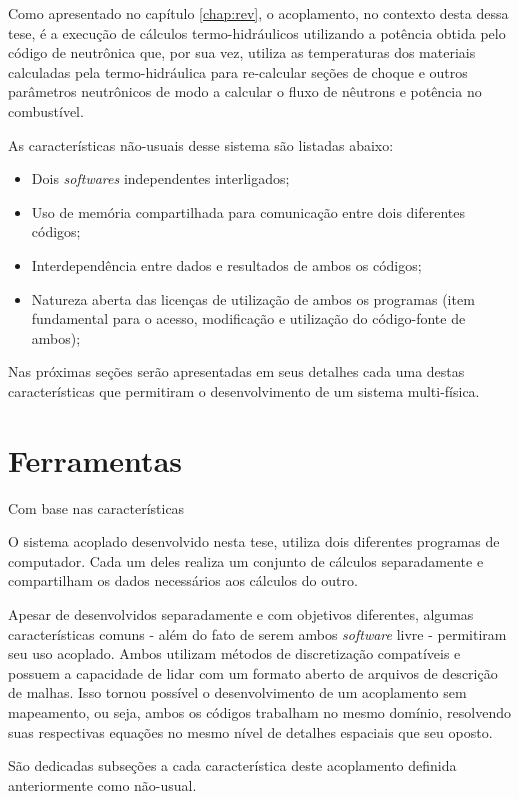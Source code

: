 Como apresentado no capítulo \ref{chap:rev}, o acoplamento, no contexto desta dessa tese, é a execução
de cálculos termo-hidráulicos utilizando a potência obtida pelo código de neutrônica que, por sua vez,
utiliza as temperaturas dos materiais calculadas pela termo-hidráulica para re-calcular seções de choque
e outros parâmetros neutrônicos de modo a calcular o fluxo de nêutrons e potência no combustível.

As características não-usuais desse sistema são listadas abaixo:

\begin{itemize}
\item Dois \textit{softwares} independentes interligados;
\item Uso de memória compartilhada para comunicação entre dois diferentes códigos;
\item Interdependência entre dados e resultados de ambos os códigos;
\item Natureza aberta das licenças de utilização de ambos os programas (item fundamental para
  o acesso, modificação e utilização do código-fonte de ambos);
\end{itemize}

Nas próximas seções serão apresentadas em seus detalhes cada uma destas características que
permitiram o desenvolvimento de um sistema multi-física.

\section{Ferramentas}
\label{sec:ferr}

Com base nas características 


O sistema acoplado desenvolvido nesta tese, utiliza dois diferentes programas de computador. Cada um deles
realiza um conjunto de cálculos separadamente e compartilham os dados necessários aos cálculos do outro.

Apesar de desenvolvidos separadamente e com objetivos diferentes, algumas características comuns - além
do fato de serem ambos \textit{software} livre - permitiram seu uso acoplado. Ambos utilizam métodos de
discretização compatíveis e possuem a capacidade de lidar com um formato aberto de arquivos de descrição
de malhas. Isso tornou possível o desenvolvimento de um acoplamento sem mapeamento, ou seja, ambos os
códigos trabalham no mesmo domínio, resolvendo suas respectivas equações no mesmo nível de detalhes
espaciais que seu oposto.

São dedicadas subseções a cada característica deste acoplamento definida anteriormente como não-usual.

